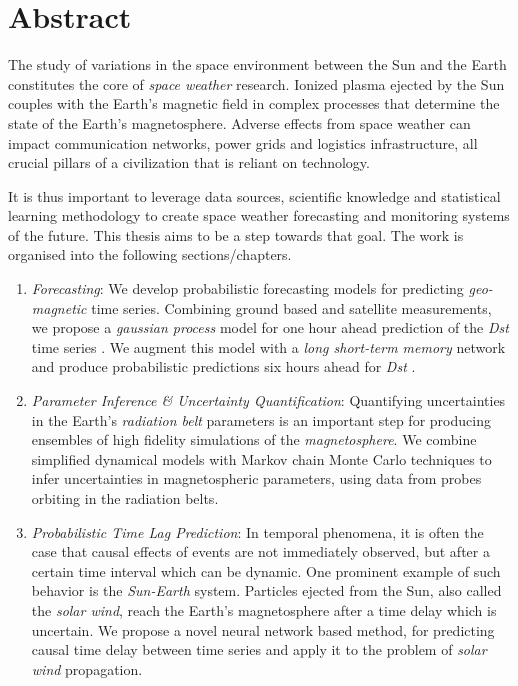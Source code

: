 \chapter*{Abstract}\label{chapter:abstract}

The study of variations in the space environment between the Sun and the Earth constitutes 
the core of \textit{space weather} research. Ionized plasma ejected by the Sun couples with 
the Earth’s magnetic field in complex processes that determine the state of the Earth's 
magnetosphere. Adverse effects from space weather can impact communication networks, 
power grids and logistics infrastructure, all crucial pillars of a civilization that 
is reliant on technology.

It is thus important to leverage data sources, scientific knowledge and statistical learning 
methodology to create space weather forecasting and monitoring systems of the future. This 
thesis aims to be a step towards that goal. The work is organised into the following 
sections/chapters.

\begin{enumerate}
\item \textit{Forecasting}: We develop probabilistic forecasting models for predicting 
\textit{geo-magnetic} time series. Combining ground based and satellite measurements, 
we propose a \textit{gaussian process} model for one hour ahead prediction of the \textit{Dst} 
time series \citep{ChandorkarDst,CHANDORKAR2018237}. We augment this model with a 
\textit{long short-term memory} network and produce probabilistic predictions six hours 
ahead for \textit{Dst} \citep{doi:10.1029/2018SW001898}.

\item \textit{Parameter Inference \& Uncertainty Quantification}: Quantifying uncertainties in the 
Earth's \textit{radiation belt} parameters is an important step for producing ensembles of high 
fidelity simulations of the \textit{magnetosphere}. We combine simplified dynamical models with 
Markov chain Monte Carlo techniques to infer uncertainties in magnetospheric parameters, 
using data from probes orbiting in the radiation belts.

\item \textit{Probabilistic Time Lag Prediction}: In temporal phenomena, it is often the case 
that causal effects of events are not immediately observed, but after a certain time interval 
which can be dynamic. One prominent example of such behavior is the \textit{Sun-Earth} system. 
Particles ejected from the Sun, also called the \textit{solar wind}, reach the Earth's magnetosphere 
after a time delay which is uncertain. We propose a novel neural network based method, for 
predicting causal time delay between time series and apply it to the problem of 
\textit{solar wind} propagation.

\end{enumerate}

%

%

